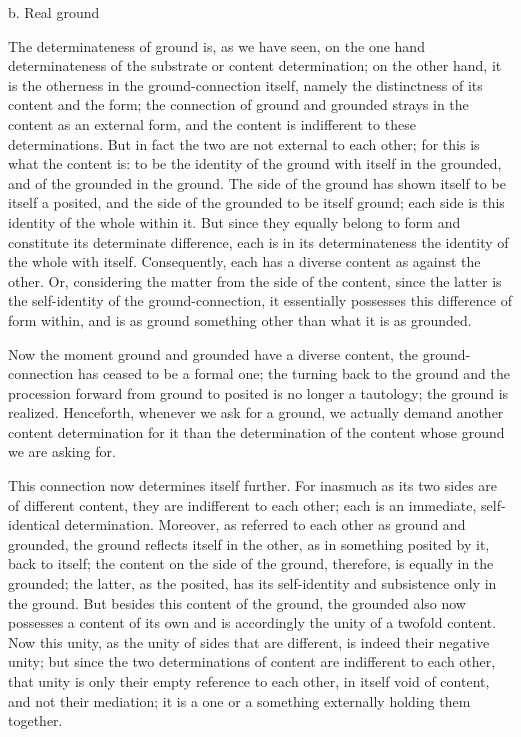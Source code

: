 b. Real ground

The determinateness of ground is, as we have seen,
on the one hand determinateness of the substrate
or content determination;
on the other hand,
it is the otherness in the ground-connection itself,
namely the distinctness of its content and the form;
the connection of ground and grounded strays
in the content as an external form,
and the content is indifferent to these determinations.
But in fact the two are not external to each other;
for this is what the content is:
to be the identity of the ground
with itself in the grounded,
and of the grounded in the ground.
The side of the ground
has shown itself to be itself a posited,
and the side of the grounded to be
itself ground;
each side is this identity of the whole within it.
But since they equally belong to form
and constitute its determinate difference,
each is in its determinateness the identity of the whole with itself.
Consequently, each has a diverse content as against the other.
Or, considering the matter from the side of the content,
since the latter is the self-identity of the ground-connection,
it essentially possesses this difference of form within,
and is as ground something other than what it is as grounded.

Now the moment ground and grounded have a diverse content,
the ground-connection has ceased to be a formal one;
the turning back to the ground and
the procession forward from ground to posited
is no longer a tautology; the ground is realized.
Henceforth, whenever we ask for a ground,
we actually demand another content determination for it
than the determination of the content whose ground we are asking for.

This connection now determines itself further.
For inasmuch as its two sides are of different content,
they are indifferent to each other;
each is an immediate, self-identical determination.
Moreover, as referred to each other as ground and grounded,
the ground reflects itself in the other,
as in something posited by it, back to itself;
the content on the side of the ground,
therefore, is equally in the grounded;
the latter, as the posited, has its
self-identity and subsistence only in the ground.
But besides this content of the ground,
the grounded also now possesses a content of its own
and is accordingly the unity of a twofold content.
Now this unity, as the unity of sides that are different,
is indeed their negative unity;
but since the two determinations of content are indifferent to each other,
that unity is only their empty reference to each other,
in itself void of content, and not their mediation;
it is a one or a something externally holding them together.

